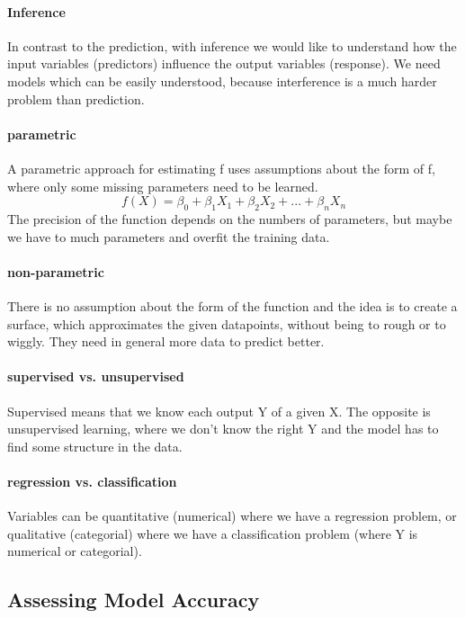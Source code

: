 \documentclass[../document.tex]{subfiles}
\begin{document}
	\paragraph{Inference}
	In contrast to the prediction, with inference we would like to understand how the input variables (predictors) influence the output variables (response). We need models which can be easily understood, because interference is a much harder problem than prediction. 
	
	\paragraph{parametric}
	A parametric approach for estimating f uses assumptions about the form of f, where only some missing parameters need to be learned.
	\begin{equation}
	f(X) = \beta_{0}+\beta_{1}X_{1}+\beta_{2}X_{2}+...+\beta_{n}X_{n}
	\end{equation}
	The precision of the function depends on the numbers of parameters, but maybe we have to much parameters and overfit the training data.
	
	\paragraph{non-parametric}
	There is no assumption about the form of the function and the idea is to create a surface, which approximates the given datapoints, without being to rough or to wiggly. They need in general more data to predict better.
	
	\paragraph{supervised vs. unsupervised}
	Supervised means that we know each output Y of a given X. The opposite is unsupervised learning, where we don't know the right Y and the model has to find some structure in the data.
	
	\paragraph{regression vs. classification}
	Variables can be quantitative (numerical) where we have a regression problem, or qualitative (categorial) where we have a classification problem (where Y is numerical or categorial).
	
	
	\subsection{Assessing Model Accuracy}
\end{document}
